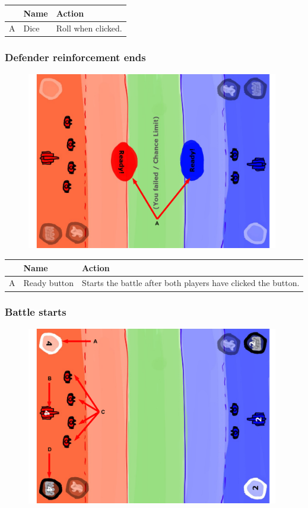 \documentclass[12pt,a4paper]{article}
\begin{document}
\begin{table}[H]
\small
\centering
\begin{tabular}{c|p{5cm}|p{7cm}}
& Name & Action \\ \hline\hline
A
&Dice
&Roll when clicked.
\end{tabular}
\end{table}

\newpage
\subsubsection{Defender reinforcement ends}

\begin{figure}[H]
  \centering
  \includegraphics[width=11cm]{pic/mocks/6-2.pdf}
\end{figure}

\begin{table}[H]
\small
\centering
\begin{tabular}{c|p{5cm}|p{7cm}}
& Name & Action \\ \hline\hline
A
&Ready button
&Starts the battle after both players have clicked the button.
\end{tabular}
\end{table}

\newpage
\subsubsection{Battle starts}

\begin{figure}[H]
  \centering
  \includegraphics[width=11cm]{pic/mocks/6-3.pdf}
\end{figure}
\end{document}
